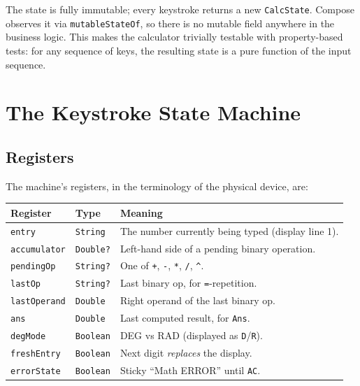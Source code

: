 \documentclass[11pt,a4paper]{article}
\begin{document}
The state is fully immutable; every keystroke returns a new \texttt{CalcState}. Compose observes it via \texttt{mutableStateOf}, so there is no mutable field anywhere in the business logic. This makes the calculator trivially testable with property-based tests: for any sequence of keys, the resulting state is a pure function of the input sequence.

\section{The Keystroke State Machine}

\subsection{Registers}

The machine's registers, in the terminology of the physical device, are:

\begin{center}
\begin{tabular}{@{}l l p{7.2cm}@{}}
\toprule
Register & Type & Meaning \\
\midrule
\texttt{entry}        & \texttt{String}        & The number currently being typed (display line 1). \\
\texttt{accumulator}  & \texttt{Double?}       & Left-hand side of a pending binary operation. \\
\texttt{pendingOp}    & \texttt{String?}       & One of \texttt{+}, \texttt{-}, \texttt{*}, \texttt{/}, \texttt{\^{}}. \\
\texttt{lastOp}       & \texttt{String?}       & Last binary op, for \texttt{=}-repetition. \\
\texttt{lastOperand}  & \texttt{Double}        & Right operand of the last binary op. \\
\texttt{ans}          & \texttt{Double}        & Last computed result, for \texttt{Ans}. \\
\texttt{degMode}      & \texttt{Boolean}       & DEG vs RAD (displayed as \texttt{D}/\texttt{R}). \\
\texttt{freshEntry}   & \texttt{Boolean}       & Next digit \emph{replaces} the display. \\
\texttt{errorState}   & \texttt{Boolean}       & Sticky ``Math ERROR'' until \texttt{AC}. \\
\bottomrule
\end{tabular}
\end{center}
\end{document}

